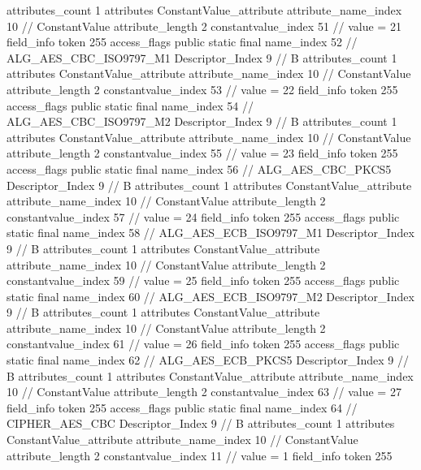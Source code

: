 {{{{{				attributes_count	1
				attributes {
				ConstantValue_attribute {
					attribute_name_index	10		// ConstantValue
					attribute_length	2
					constantvalue_index	51		// value = 21
				}
				}
			}
			field_info {
				token	255
				access_flags	public static final
				name_index	52		// ALG_AES_CBC_ISO9797_M1
				Descriptor_Index	9		// B
				attributes_count	1
				attributes {
				ConstantValue_attribute {
					attribute_name_index	10		// ConstantValue
					attribute_length	2
					constantvalue_index	53		// value = 22
				}
				}
			}
			field_info {
				token	255
				access_flags	public static final
				name_index	54		// ALG_AES_CBC_ISO9797_M2
				Descriptor_Index	9		// B
				attributes_count	1
				attributes {
				ConstantValue_attribute {
					attribute_name_index	10		// ConstantValue
					attribute_length	2
					constantvalue_index	55		// value = 23
				}
				}
			}
			field_info {
				token	255
				access_flags	public static final
				name_index	56		// ALG_AES_CBC_PKCS5
				Descriptor_Index	9		// B
				attributes_count	1
				attributes {
				ConstantValue_attribute {
					attribute_name_index	10		// ConstantValue
					attribute_length	2
					constantvalue_index	57		// value = 24
				}
				}
			}
			field_info {
				token	255
				access_flags	public static final
				name_index	58		// ALG_AES_ECB_ISO9797_M1
				Descriptor_Index	9		// B
				attributes_count	1
				attributes {
				ConstantValue_attribute {
					attribute_name_index	10		// ConstantValue
					attribute_length	2
					constantvalue_index	59		// value = 25
				}
				}
			}
			field_info {
				token	255
				access_flags	public static final
				name_index	60		// ALG_AES_ECB_ISO9797_M2
				Descriptor_Index	9		// B
				attributes_count	1
				attributes {
				ConstantValue_attribute {
					attribute_name_index	10		// ConstantValue
					attribute_length	2
					constantvalue_index	61		// value = 26
				}
				}
			}
			field_info {
				token	255
				access_flags	public static final
				name_index	62		// ALG_AES_ECB_PKCS5
				Descriptor_Index	9		// B
				attributes_count	1
				attributes {
				ConstantValue_attribute {
					attribute_name_index	10		// ConstantValue
					attribute_length	2
					constantvalue_index	63		// value = 27
				}
				}
			}
			field_info {
				token	255
				access_flags	public static final
				name_index	64		// CIPHER_AES_CBC
				Descriptor_Index	9		// B
				attributes_count	1
				attributes {
				ConstantValue_attribute {
					attribute_name_index	10		// ConstantValue
					attribute_length	2
					constantvalue_index	11		// value = 1
				}
				}
			}
			field_info {
				token	255
}}}}}
